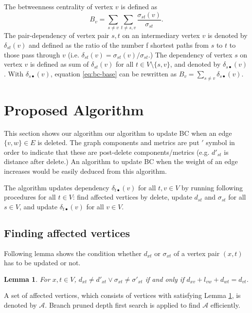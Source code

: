 \documentclass{article}
\newtheorem{lemma}{Lemma}
\begin{document}
The betweenness centrality of vertex $v$ is defined as
\begin{equation}
  B_{v}=\sum_{s\neq v}\sum_{t\neq s,v}\frac{\sigma_{st}(v)}{\sigma_{st}}.
  \label{eq:bc-base}
\end{equation}
The pair-dependency of vertex pair $s,t$ on an intermediary vertex $v$ is denoted by $\delta_{st}(v)$ and defined as the ratio of the number f shortest paths from $s$ to $t$ to those pass through $v$
(i.e. $\delta_{st}(v)=\sigma_{st}(v)/\sigma_{st}$.)
The dependency of vertex $s$ on vertex $v$ is defined as sum of $\delta_{st}(v)$ for all $t\in V\setminus\{s,v\}$, and denoted by $\delta_{s\bullet}(v)$.
With $\delta_{s\bullet}(v)$, equation \eqref{eq:bc-base} can be rewritten as $B_{v}=\sum_{s\neq v}\delta_{s\bullet}(v)$.

\section{Proposed Algorithm}
This section shows our algorithm our algorithm to update BC when an edge $\{v,w\}\in E$ is deleted.
The graph components and metrics are put $'$ symbol in order to indicate that these are post-delete components/metrics (e.g. $d'_{st}$ is distance after delete.)
An algorithm to update BC when the weight of an edge increases would be easily deduced from this algorithm.

The algorithm updates dependency $\delta_{t\bullet}(v)$ for all $t,v\in V$ by running following procedures for all $t\in V$:
find affected vertices by delete, update $d_{st}$ and $\sigma_{st}$ for all $s\in V$, and update $\delta_{t\bullet}(v)$ for all $v\in V$.

\subsection*{Finding affected vertices}
Following lemma shows the condition whether $d_{xt}$ or $\sigma_{xt}$ of a vertex pair $(x,t)$ has to be updated or not.

\begin{lemma}
  \label{lm:affected-vertices}
  For $x,t\in V$, $d_{xt}\neq d'_{xt}\lor\sigma_{xt}\neq\sigma'_{xt}$ if and only if $d_{xv}+l_{vw}+d_{wt}=d_{vt}$.
\end{lemma}

A set of affected vertices, which consists of vertices with satisfying Lemma \ref{lm:affected-vertices}, is denoted by $\mathcal{A}$.
Branch pruned depth first search is applied to find $\mathcal{A}$ efficiently.
\end{document}
